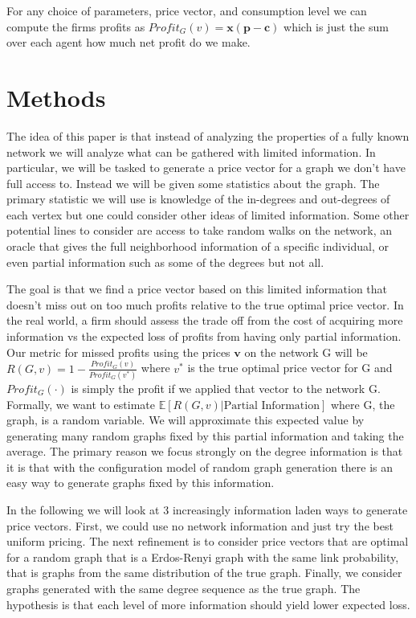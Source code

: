 \documentclass[12pt]{article}
\newcommand{\tb}[1]{\textbf{#1}}
\begin{document}
  For any choice of parameters, price vector, and consumption level we can compute the firms profits as $Profit_{G}(v)= \tb{x} (\tb{p} - \tb{c})$ which is just the sum over each agent how much net profit do we make.
\section{Methods}

 The idea of this paper is that instead of analyzing the properties of a fully known network we will analyze what can be gathered with limited information. In particular, we will be tasked to generate  a price vector for a graph we don't have full access to. Instead we will be given some statistics about the graph. The primary statistic we will use is knowledge of the in-degrees and out-degrees of each vertex but one could consider other ideas of limited information. Some other potential lines to consider are access to take random walks on the network,  an oracle that gives the full neighborhood information of a specific individual, or even partial information such as some of the degrees but not all.

 The goal is that we find a price vector based on this limited information that doesn't miss out on too much profits relative to the true optimal price vector. In the real world, a firm should assess the trade off from the cost of acquiring more information vs the expected loss of profits from having only partial information. Our metric for missed profits using the prices $\tb{v}$ on the network G will be $R(G,v) = 1 - \frac{Profit_{G}(v)}{Profit_{G}(v^{*})}$
where $v^{*}$ is the true optimal price vector for G and $Profit_{G}(\cdot)$ is simply the profit if we applied that vector to the network G. Formally, we want to estimate $\mathbb{E}[ R(G,v) | \text{Partial Information}]$ where G, the graph, is a random variable. We will approximate this expected value by generating many random graphs fixed by this partial information and taking the average. The primary reason we focus strongly on the degree information is that it is that with the configuration model of random graph generation there is an easy way to generate graphs fixed by this information.

 In the following we will look at 3 increasingly information laden ways to generate price vectors. First, we could use no network information and just try the best uniform pricing. The next refinement is to consider price vectors that are optimal for a random graph that is a Erdos-Renyi graph with the same link probability, that is graphs from the same distribution of the true graph. Finally, we consider graphs generated with the same degree sequence as the true graph. The hypothesis is that each level of more information should yield lower expected loss.
\end{document}
